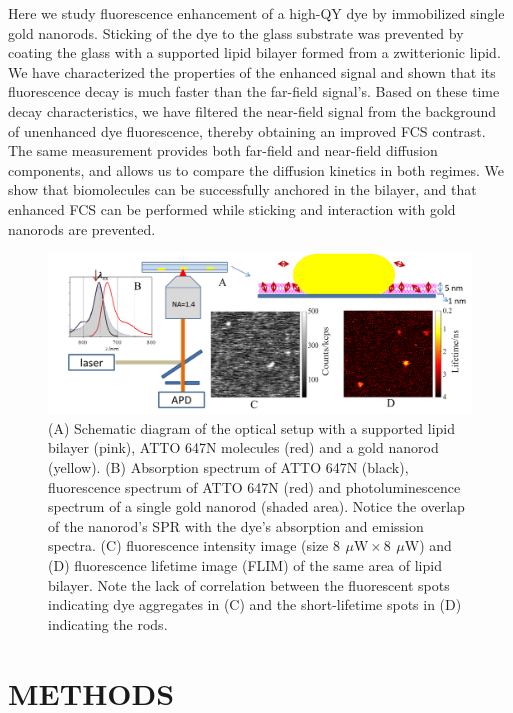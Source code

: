 \documentclass[journal=jacsat,manuscript=article]{achemso}
\newcommand{\uW}{\ensuremath{\,\mu\textrm{W}}}
\begin{document}
Here we study fluorescence enhancement of a high-QY dye by immobilized single gold nanorods. Sticking of the dye to the glass substrate was prevented by coating the glass with a supported lipid bilayer formed from a zwitterionic lipid. We have characterized the properties of the enhanced signal and shown that its fluorescence decay is much faster than the far-field signal’s. Based on these time decay characteristics, we have filtered the near-field signal from the background of unenhanced dye fluorescence, thereby obtaining an improved FCS contrast. The same measurement provides both far-field and near-field diffusion components, and allows us to compare the diffusion kinetics in both regimes. We show that biomolecules can be successfully anchored in the bilayer, and that enhanced FCS can be performed while sticking and interaction with gold nanorods are prevented.\\
\begin{figure}
	\centering
	\includegraphics[width=\textwidth]{schematic.png}
	\caption{(A) Schematic diagram of the optical setup with a supported lipid bilayer (pink), ATTO 647N molecules (red) and a gold nanorod (yellow). (B) Absorption spectrum of ATTO 647N (black), fluorescence spectrum of ATTO 647N (red) and photoluminescence spectrum of a single gold nanorod (shaded area). Notice the overlap of the nanorod's SPR with the dye's absorption and emission spectra. (C) fluorescence intensity image (size $8~\uW \times 8~\uW$) and (D) fluorescence lifetime image (FLIM) of the same area of lipid bilayer. Note the lack of correlation between the fluorescent spots indicating dye aggregates in (C) and the short-lifetime spots in (D) indicating the rods.}
	\label{fig:schematic}
\end{figure}
\section{METHODS}
\end{document}
